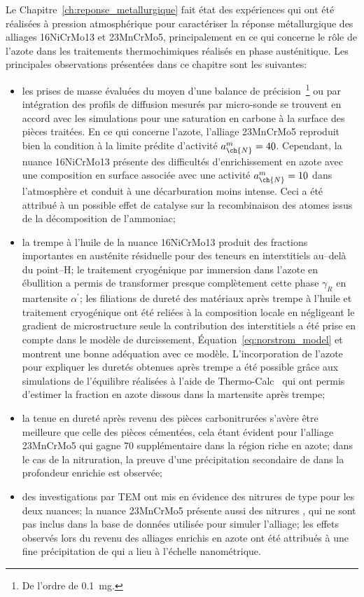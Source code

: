 Le Chapitre~\ref{ch:reponse_metallurgique} fait état des expériences qui ont été réalisées à pression atmosphérique pour caractériser la réponse métallurgique des alliages 16NiCrMo13 et 23MnCrMo5, principalement en ce qui concerne le rôle de l'azote dans les traitements thermochimiques réalisés en phase austénitique. Les principales observations présentées dans ce chapitre sont les suivantes:
\begin{itemize}
  \item les prises de masse évaluées du moyen d'une balance de précision~\footnote{De l'ordre de \SI{0,1}{\milli\gram}.} ou par intégration des profils de diffusion mesurés par micro-sonde se trouvent en accord avec les simulations pour une saturation en carbone à la surface des pièces traitées. En ce qui concerne l'azote, l'alliage 23MnCrMo5 reproduit bien la condition à la limite prédite d'activité $a_{\ch{N}}^{m}=40$. Cependant, la nuance 16NiCrMo13 présente des difficultés d'enrichissement en azote avec une composition en surface associée avec une activité $a_{\ch{N}}^{m}=10$ dans l'atmosphère et conduit à une décarburation moins intense. Ceci a été attribué à un possible effet de catalyse sur la recombinaison des atomes issus de la décomposition de l'ammoniac;
  
  \item la trempe à l'huile de la nuance 16NiCrMo13 produit des fractions importantes en austénite résiduelle pour des teneurs en interstitiels au--delà du point--H; le traitement cryogénique par immersion dans l'azote en ébullition a permis de transformer presque complètement cette phase $\gamma_{R}$ en martensite $\alpha^{\prime}$; les filiations de dureté des matériaux après trempe à l'huile et traitement cryogénique ont été reliées à la composition locale en négligeant le gradient de microstructure \textendash{} seule la contribution des interstitiels a été prise en compte dans le modèle de durcissement, Équation~\ref{eq:norstrom_model} \textendash{} et montrent une bonne adéquation avec ce modèle. L'incorporation de l'azote pour expliquer les duretés obtenues après trempe a été possible grâce aux simulations de l'équilibre réalisées à l'aide de Thermo-Calc~\cite{Andersson2002,Borgenstam2000} qui ont permis d'estimer la fraction en azote dissous dans la martensite après trempe;
  
  \item la tenue en dureté après revenu des pièces carbonitrurées s'avère être meilleure que celle des pièces cémentées, cela étant évident pour l'alliage 23MnCrMo5 qui gagne \SI{70}{\HV} supplémentaire dans la région riche en azote; dans le cas de la nitruration, la preuve d'une précipitation secondaire de  dans la profondeur enrichie est observée;
  
  \item des investigations par TEM ont mis en évidence des nitrures de type  pour les deux nuances; la nuance 23MnCrMo5 présente aussi des nitrures , qui ne sont pas inclus dans la base de données utilisée pour simuler l'alliage; les effets observés lors du revenu des alliages enrichis en azote ont été attribués à une fine précipitation de  qui a lieu à l'échelle nanométrique.
\end{itemize}

\endinput